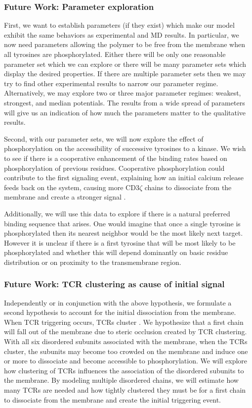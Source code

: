 \documentclass[../../AdvancementSummary.tex]{subfiles}
\begin{document}
\subsubsection{Future Work: Parameter exploration}

First, we want to establish parameters (if they exist) which make our model exhibit the same behaviors as experimental and MD results. In particular, we now need parameters allowing the polymer to be free from the membrane when all tyrosines are phosphorylated. Either there will be only one reasonable parameter set which we can explore or there will be many parameter sets which display the desired properties. If there are multiple parameter sets then we may try to find other experimental results to narrow our parameter regime. Alternatively, we may explore two or three major parameter regimes: weakest, strongest, and median potentials. The results from a wide spread of parameters will give us an indication of how much the parameters matter to the qualitative results. 

Second, with our parameter sets, we will now explore the effect of phosphorylation on the accessibility of successive tyrosines to a kinase. We wish to see if there is a cooperative enhancement of the binding rates based on phosphorylation of previous residues. Cooperative phosphorylation could contribute to the first signaling event, explaining how an initial calcium release feeds back on the system, causing more CD3$\zeta$ chains to dissociate from the membrane and create a stronger signal \cite{Shi2013}.

Additionally, we will use this data to explore if there is a natural preferred binding sequence that arises. One would imagine that once a single tyrosine is phosphorylated then its nearest neighbor would be the most likely next target. However it is unclear if there is a first tyrosine that will be most likely to be phosphorylated and whether this will depend dominantly on basic residue distribution or on proximity to the transmembrane region. 

\subsubsection{Future Work: TCR clustering as cause of initial signal}
Independently or in conjunction with the above hypothesis, we formulate a second hypothesis to account for the initial dissociation from the membrane. When TCR triggering occurs, TCRs cluster \cite{Monks1998, Bunnell2002}. We hypothesize that a first chain will fall out of the membrane due to steric occlusion created by TCR clustering. With all six disordered subunits associated with the membrane, when the TCRs cluster, the subunits may become too crowded on the membrane and induce one or more to dissociate and become accessible to phosphorylation. We will explore how clustering of TCRs influences the association of the disordered subunits to the membrane. By modeling multiple disordered chains, we will estimate how many TCRs are needed and how tightly clustered they must be for a first chain to dissociate from the membrane and create the initial triggering event.
\end{document}
